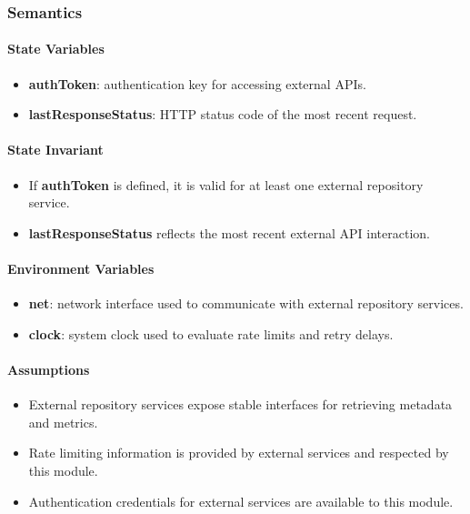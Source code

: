\documentclass[12pt, titlepage]{article}
\begin{document}
\begin{itemize}
  \subsubsection{Semantics}

  \paragraph{State Variables}
  \begin{itemize}
    \item \textbf{authToken}: authentication key for accessing external APIs.
    \item \textbf{lastResponseStatus}: HTTP status code of the most recent request.
  \end{itemize}

  \paragraph{State Invariant}
  \begin{itemize}
    \item If \textbf{authToken} is defined, it is valid for at least one external repository service.
    \item \textbf{lastResponseStatus} reflects the most recent external API interaction.
  \end{itemize}

  \paragraph{Environment Variables}
  \begin{itemize}
    \item \textbf{net}: network interface used to communicate with external repository services.
    \item \textbf{clock}: system clock used to evaluate rate limits and retry delays.
  \end{itemize}

  \paragraph{Assumptions}
  \begin{itemize}
    \item External repository services expose stable interfaces for retrieving metadata and metrics.
    \item Rate limiting information is provided by external services and respected by this module.
    \item Authentication credentials for external services are available to this module.
  \end{itemize}


\end{itemize}
\end{document}
